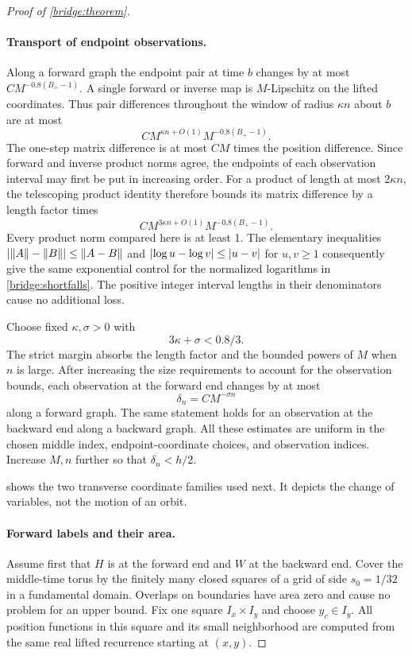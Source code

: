 \begin{proof}[Proof of \cref{bridge:theorem}]
\paragraph{Transport of endpoint observations.}
Along a forward graph the endpoint pair at time $b$ changes by at
most $CM^{-0.8(B_+-1)}$. A single forward or inverse map is
$M$-Lipschitz on the lifted coordinates. Thus pair differences
throughout the window of radius $\kappa n$ about $b$ are at most
\[
 C M^{\kappa n+O(1)}M^{-0.8(B_+-1)}.
\]
The one-step matrix difference is at most $CM$ times the position
difference. Since forward and inverse product norms agree, the
endpoints of each observation interval may first be put in increasing
order. For a product of length at most $2\kappa n$, the
telescoping product identity therefore bounds its matrix difference
by a length factor times
\[
 C M^{3\kappa n+O(1)}M^{-0.8(B_+-1)}.
\]
Every product norm compared here is at least 1. The elementary
inequalities $\left\lvert\left\lVert A\right\rVert-\left\lVert B\right\rVert\right\rvert\leq\left\lVert A-B\right\rVert$ and
$\left\lvert\log u-\log v\right\rvert\leq\left\lvert u-v\right\rvert$ for $u,v\geq1$ consequently
give the same exponential control for the normalized logarithms in
\cref{bridge:shortfalls}. The positive integer interval lengths in
their denominators cause no additional loss.

Choose fixed $\kappa,\sigma>0$ with
\begin{equation}
 3\kappa+\sigma<0.8/3.
 \label{bridge:error-exponents}
\end{equation}
The strict margin absorbs the length factor and the bounded powers
of $M$ when $n$ is large. After increasing the size requirements to
account for the observation bounds, each observation at the forward
end changes by at most
\begin{equation}
 \delta_n=C M^{-\sigma n}
 \label{bridge:observation-error}
\end{equation}
along a forward graph. The same statement holds for an observation
at the backward end along a backward graph. All these estimates are
uniform in the chosen middle index, endpoint-coordinate choices,
and observation indices. Increase $M,n$ further so that
$\delta_n<h/2$.

 shows the two transverse coordinate families
used next. It depicts the change of variables, not the motion of an orbit.


\paragraph{Forward labels and their area.}
Assume first that $H$ is at the forward end and $W$ at the backward
end. Cover the middle-time torus by the finitely many closed squares
of a grid of side $s_0=1/32$ in a fundamental domain. Overlaps on
boundaries have area zero and cause no problem for an upper bound.
Fix one square $I_x\times I_y$ and choose $y_c\in I_y$. All position
functions in this square and its small neighborhood are computed
from the same real lifted recurrence starting at $(x,y)$.


\end{proof}
